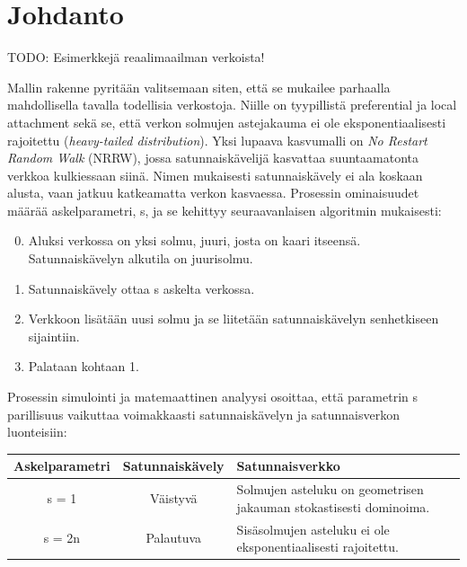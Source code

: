 \documentclass[finnish, 12pt, a4paper, sci, utf8, pdfa]{aaltothesis}
\begin{document}
\cleardoublepage

\section{Johdanto}

\thispagestyle{empty}

TODO: Esimerkkejä reaalimaailman verkoista!

Mallin rakenne pyritään valitsemaan siten, että se mukailee parhaalla mahdollisella tavalla todellisia verkostoja. Niille on tyypillistä preferential ja local attachment sekä se, että verkon solmujen astejakauma ei ole eksponentiaalisesti rajoitettu (\textit{heavy-tailed distribution}). 
Yksi lupaava kasvumalli on \textit{No Restart Random Walk} (NRRW), jossa satunnaiskävelijä kasvattaa suuntaamatonta verkkoa kulkiessaan siinä. Nimen mukaisesti satunnaiskävely ei ala koskaan alusta, vaan jatkuu katkeamatta verkon kasvaessa. Prosessin ominaisuudet määrää askelparametri, s, ja se kehittyy seuraavanlaisen algoritmin mukaisesti:

\begin{enumerate}[noitemsep]
   \setcounter{enumi}{-1}
   \item Aluksi verkossa on yksi solmu, juuri, josta on kaari itseensä. Satunnaiskävelyn alkutila on juurisolmu.
   \item Satunnaiskävely ottaa s askelta verkossa.
   \item Verkkoon lisätään uusi solmu ja se liitetään satunnaiskävelyn senhetkiseen sijaintiin.
   \item Palataan kohtaan 1.
\end{enumerate}

Prosessin simulointi ja matemaattinen analyysi osoittaa, että parametrin s parillisuus vaikuttaa voimakkaasti satunnaiskävelyn ja satunnaisverkon luonteisiin:

\begin{table}[htb]
   \begin{center}
   \begin{tabular}{|c|c|p{7.5cm}|}
   \hline
   \textbf{Askelparametri} & \textbf{Satunnaiskävely} & \textbf{Satunnaisverkko} \\ \hline
   s = 1          & Väistyvä        & Solmujen asteluku on geometrisen jakauman stokastisesti dominoima. \\ \hline
   s = 2n         & Palautuva       & Sisäsolmujen asteluku ei ole eksponentiaalisesti rajoitettu. \\ \hline
   \end{tabular}
   \end{center}
\end{table}
\end{document}
